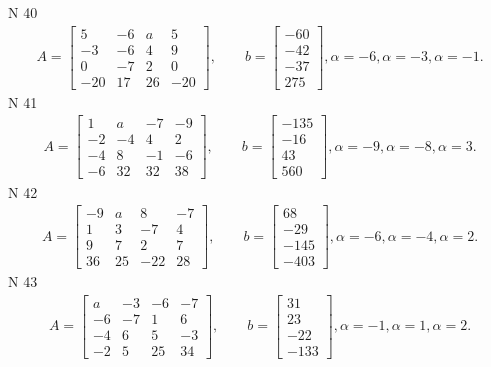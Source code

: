\documentclass[11pt]{report}
\begin{document}
N 40
\begin{align*}
 A = \left[\begin{matrix}5 & -6 & a & 5\\-3 & -6 & 4 & 9\\0 & -7 & 2 & 0\\-20 & 17 & 26 & -20\end{matrix}\right],
    \qquad b = \left[\begin{matrix}-60\\-42\\-37\\275\end{matrix}\right], \alpha = -6, \alpha = -3, \alpha = -1. 
 \end{align*}
N 41
\begin{align*}
 A = \left[\begin{matrix}1 & a & -7 & -9\\-2 & -4 & 4 & 2\\-4 & 8 & -1 & -6\\-6 & 32 & 32 & 38\end{matrix}\right],
    \qquad b = \left[\begin{matrix}-135\\-16\\43\\560\end{matrix}\right], \alpha = -9, \alpha = -8, \alpha = 3. 
 \end{align*}
N 42
\begin{align*}
 A = \left[\begin{matrix}-9 & a & 8 & -7\\1 & 3 & -7 & 4\\9 & 7 & 2 & 7\\36 & 25 & -22 & 28\end{matrix}\right],
    \qquad b = \left[\begin{matrix}68\\-29\\-145\\-403\end{matrix}\right], \alpha = -6, \alpha = -4, \alpha = 2. 
 \end{align*}
N 43
\begin{align*}
 A = \left[\begin{matrix}a & -3 & -6 & -7\\-6 & -7 & 1 & 6\\-4 & 6 & 5 & -3\\-2 & 5 & 25 & 34\end{matrix}\right],
    \qquad b = \left[\begin{matrix}31\\23\\-22\\-133\end{matrix}\right], \alpha = -1, \alpha = 1, \alpha = 2. 
 \end{align*}
\end{document}
